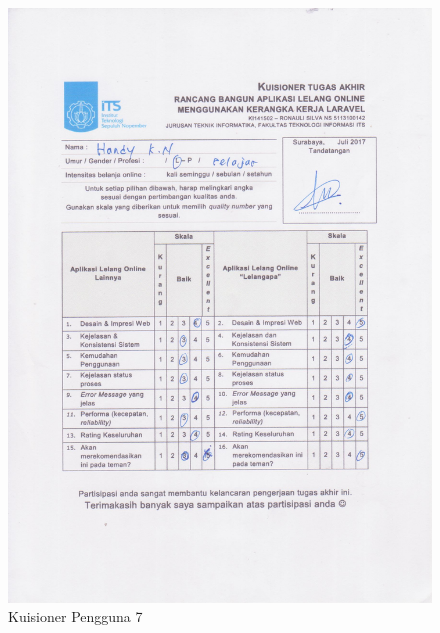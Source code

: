 \begin{figure}[H]
	\centering
	\includegraphics[width=\textwidth]{images/bab5/ujipengguna/7.jpg}
	\caption{Kuisioner Pengguna 7}
\end{figure}
